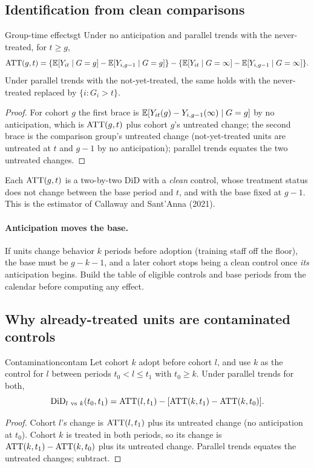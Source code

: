 \documentclass[11pt]{article}
\begin{document}
\subsection{Identification from clean comparisons}

\begin{prop}{Group-time effects}{gt}
Under no anticipation and parallel trends with the never-treated, for $t \ge g$,
\[
  \text{ATT}(g, t) = \{\mathbb{E}[Y_{it} \mid G=g] - \mathbb{E}[Y_{i,g-1} \mid G=g]\} - \{\mathbb{E}[Y_{it} \mid G=\infty] - \mathbb{E}[Y_{i,g-1} \mid G=\infty]\}.
\]
Under parallel trends with the not-yet-treated, the same holds with the never-treated replaced by $\{i : G_i > t\}$.
\end{prop}
\begin{proof}
For cohort $g$ the first brace is $\mathbb{E}[Y_{it}(g) - Y_{i,g-1}(\infty) \mid G=g]$ by no anticipation, which is $\text{ATT}(g,t)$ plus cohort $g$'s untreated change; the
second brace is the comparison group's untreated change (not-yet-treated units are untreated at $t$ and $g - 1$ by no anticipation); parallel trends
equates the two untreated changes.
\end{proof}

Each $\text{ATT}(g,t)$ is a two-by-two DiD with a \emph{clean} control, whose treatment status does not change between the base period and $t$, and with the
base fixed at $g - 1$. This is the estimator of Callaway and Sant'Anna (2021).

\paragraph{Anticipation moves the base.} If units change behavior $k$ periods before adoption (training staff off the floor), the base must be $g - k - 1$,
and a later cohort stops being a clean control once \emph{its} anticipation begins. Build the table of eligible controls and base periods from the calendar
before computing any effect.

\subsection{Why already-treated units are contaminated controls}

\begin{prop}{Contamination}{contam}
Let cohort $k$ adopt before cohort $l$, and use $k$ as the control for $l$ between periods $t_0 < l \le t_1$ with $t_0 \ge k$. Under parallel trends for both,
\[
  \text{DiD}_{l\ \text{vs}\ k}(t_0, t_1) = \text{ATT}(l, t_1) - [\text{ATT}(k, t_1) - \text{ATT}(k, t_0)].
\]
\end{prop}
\begin{proof}
Cohort $l$'s change is $\text{ATT}(l, t_1)$ plus its untreated change (no anticipation at $t_0$). Cohort $k$ is treated in both periods, so its change is
$\text{ATT}(k,t_1) - \text{ATT}(k,t_0)$ plus its untreated change. Parallel trends equates the untreated changes; subtract.
\end{proof}
\end{document}
